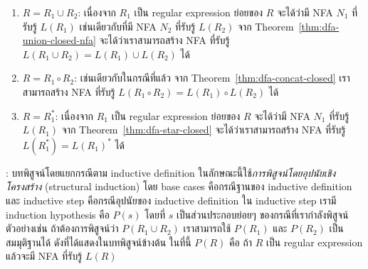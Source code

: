 \begin{lemma}
\begin{pf}
\begin{enumerate}
\item $R=R_1\cup R_2$: เนื่องจาก $R_1$ เป็น regular expression ย่อยของ $R$ จะได้ว่ามี NFA $N_1$ ที่รับรู้ $L(R_1)$ เช่นเดียวกับที่มี NFA $N_2$ ที่รับรู้ $L(R_2)$ \enskip จาก Theorem~\ref{thm:dfa-union-closed-nfa} จะได้ว่าเราสามารถสร้าง NFA ที่รับรู้ $L(R_1\cup R_2)=L(R_1)\cup L(R_2)$ ได้

\item $R=R_1\circ R_2$: เช่นเดียวกับในกรณีที่แล้ว จาก Theorem~\ref{thm:dfa-concat-closed} เราสามารถสร้าง NFA ที่รับรู้ $L(R_1\circ R_2)=L(R_1)\circ L(R_2)$ ได้

\item $R=R_1^*$: เนื่องจาก $R_1$ เป็น regular expression ย่อยของ $R$ จะได้ว่ามี NFA $N_1$ ที่รับรู้ $L(R_1)$ \enskip จาก Theorem~\ref{thm:dfa-star-closed} จะได้ว่าเราสามารถสร้าง NFA ที่รับรู้ $L(R_1^*)=L(R_1)^*$ ได้
\end{enumerate}
\end{pf}
: บทพิสูจน์โดยแยกกรณีตาม inductive definition ในลักษณะนี้ใช้\emph{การพิสูจน์โดยอุปนัยเชิงโครงสร้าง} (structural induction) โดย base cases คือกรณีฐานของ inductive definition และ inductive step คือกรณีอุปนัยของ inductive definition \enskip ใน inductive step เรามี induction hypothesis คือ $P(s)$ โดยที่ $s$ เป็นส่วนประกอบย่อยๆ ของกรณีที่เรากำลังพิสูจน์ ตัวอย่างเช่น ถ้าต้องการพิสูจน์ว่า $P(R_1\cup R_2)$ เราสามารถใช้ $P(R_1)$ และ $P(R_2)$ เป็นสมมุติฐานได้ ดังที่ได้แสดงในบทพิสูจน์ข้างต้น \enskip ในที่นี้ $P(R)$ คือ ถ้า $R$ เป็น regular expression แล้วจะมี NFA ที่รับรู้ $L(R)$
\end{lemma}
%
